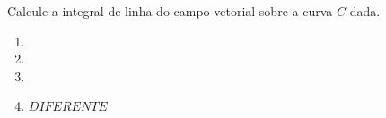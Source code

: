 	Calcule a integral de linha do campo vetorial sobre a curva $C$ dada.
	
	\begin{enumerate}[resume]
	
		\item
		\resposta{}

		\item
		\resposta{}

		\item
		\resposta{}

		\item $DIFERENTE$
	
	\end{enumerate}
		
	\vspace{5mm}	
	
	


